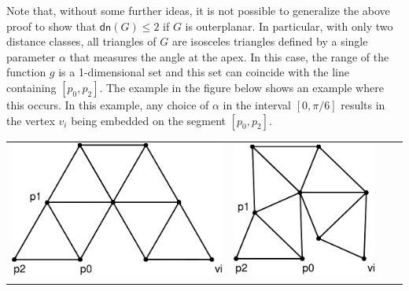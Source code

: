 \documentclass{article}
\newcommand{\dn}{\mathsf{dn}}
\begin{document}
Note that, without some further ideas, it is not possible to
generalize the above proof to show that $\dn(G)\le 2$ if $G$ is
outerplanar.  In particular, with only two distance classes, all
triangles of $G$ are isosceles triangles defined by a single parameter
$\alpha$ that measures the angle at the apex.  In this case, the range
of the function $g$ is a 1-dimensional set and this set can coincide
with the line containing $[p_0,p_2]$.  The example in the figure below
shows an example where this occurs.  In this example, any choice
of $\alpha$ in the interval $[0,\pi/6]$ results in the vertex $v_i$ being
embedded on the segment $[p_0,p_2]$.

\begin{tabular}{cccc}
\includegraphics[scale=.30]{no2-1} &
\includegraphics[scale=.30]{no2-2} &

\end{tabular}
\end{document}
